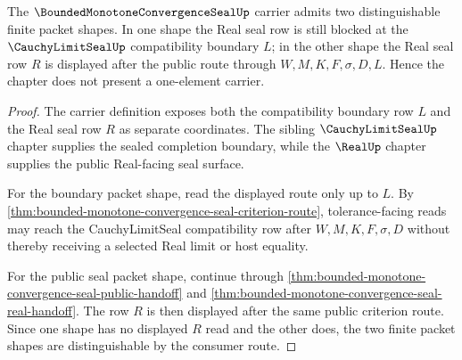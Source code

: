 \begin{theorem}
\label{thm:bounded-monotone-convergence-seal-nontriviality}
The $\BoundedMonotoneConvergenceSealUp$ carrier admits two distinguishable finite packet shapes. In one shape the Real seal row is still blocked at the $\CauchyLimitSealUp$ compatibility boundary $L$; in the other shape the Real seal row $R$ is displayed after the public route through $W,M,K,F,\sigma,D,L$. Hence the chapter does not present a one-element carrier.
\end{theorem}
\begin{proof}
The carrier definition exposes both the compatibility boundary row $L$ and the Real seal row $R$ as separate coordinates. The sibling $\CauchyLimitSealUp$ chapter supplies the sealed completion boundary, while the $\RealUp$ chapter supplies the public Real-facing seal surface.

For the boundary packet shape, read the displayed route only up to $L$. By \autoref{thm:bounded-monotone-convergence-seal-criterion-route}, tolerance-facing reads may reach the CauchyLimitSeal compatibility row after $W,M,K,F,\sigma,D$ without thereby receiving a selected Real limit or host equality.

For the public seal packet shape, continue through \autoref{thm:bounded-monotone-convergence-seal-public-handoff} and \autoref{thm:bounded-monotone-convergence-seal-real-handoff}. The row $R$ is then displayed after the same public criterion route. Since one shape has no displayed $R$ read and the other does, the two finite packet shapes are distinguishable by the consumer route.
\end{proof}

